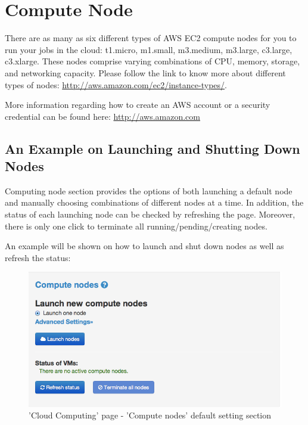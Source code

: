 \documentclass[12pt,notitlepage,nofootinbib]{revtex4}
\begin{document}
\newpage

\section{Compute Node}
There are as many as six different types of AWS EC2 compute nodes for you to run your jobs in the cloud: t1.micro, m1.small, m3.medium, m3.large, c3.large, c3.xlarge. These nodes comprise varying combinations of CPU, memory, storage, and networking capacity. Please follow the link to know more about different types of nodes: \url{http://aws.amazon.com/ec2/instance-types/}.

More information regarding how to create an AWS account or a security credential can be found here: \url{http://aws.amazon.com}

\subsection{An Example on Launching and Shutting Down Nodes}
Computing node section provides the options of both launching a default node and manually choosing combinations of different nodes at a time. In addition, the status of each launching node can be checked by refreshing the page. Moreover, there is only one click to terminate all running/pending/creating nodes.

An example will be shown on how to launch and shut down nodes as well as refresh the status:

\begin{figure}[!ht]
\centering
\includegraphics[scale=0.45]{T6_fig_computenode1.png}
\caption{'Cloud Computing' page - 'Compute nodes' default setting section}
\label{fig:2}
\end{figure}
\end{document}
